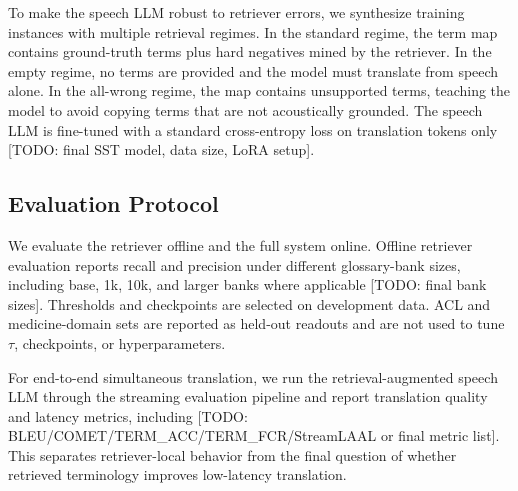 To make the speech LLM robust to retriever errors, we synthesize training instances with multiple retrieval regimes.  In the standard regime, the term map contains ground-truth terms plus hard negatives mined by the retriever.  In the empty regime, no terms are provided and the model must translate from speech alone.  In the all-wrong regime, the map contains unsupported terms, teaching the model to avoid copying terms that are not acoustically grounded.  The speech LLM is fine-tuned with a standard cross-entropy loss on translation tokens only [TODO: final SST model, data size, LoRA setup].

\subsection{Evaluation Protocol}
\label{sec:evaluation_protocol}

We evaluate the retriever offline and the full system online.  Offline retriever evaluation reports recall and precision under different glossary-bank sizes, including base, 1k, 10k, and larger banks where applicable [TODO: final bank sizes].  Thresholds and checkpoints are selected on development data.  ACL and medicine-domain sets are reported as held-out readouts and are not used to tune $\tau$, checkpoints, or hyperparameters.

For end-to-end simultaneous translation, we run the retrieval-augmented speech LLM through the streaming evaluation pipeline and report translation quality and latency metrics, including [TODO: BLEU/COMET/TERM\_ACC/TERM\_FCR/StreamLAAL or final metric list].  This separates retriever-local behavior from the final question of whether retrieved terminology improves low-latency translation.
